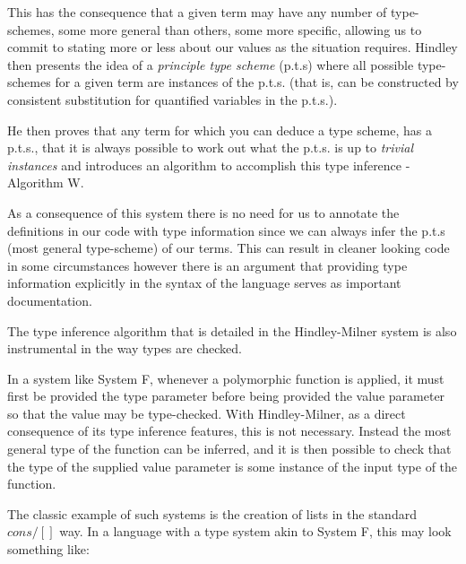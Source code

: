 \documentclass{ProgressReport}[2020/09/15]
\begin{document}
            This has the consequence that a given term may have any number of
            type-schemes, some more general than others, some more specific,
            allowing us to commit to stating more or less about our
            values as the situation requires. Hindley then presents
            the idea of a \textit{principle type scheme} (p.t.s) where
            all possible type-schemes for a given term are instances
            of the p.t.s. (that is, can be constructed by consistent
            substitution for quantified variables in the p.t.s.).
            
            He then proves that any term for which you can deduce a type scheme,
            has a p.t.s., that it is always possible to work out what the p.t.s. is
            up to \textit{trivial instances} and introduces an
            algorithm to accomplish this type inference - Algorithm W.

            As a consequence of this system there is no need for us to
            annotate the definitions in our code with type
            information since we can always infer the p.t.s (most
            general type-scheme) of our terms. This can result
            in cleaner looking code in some circumstances however
            there is an argument that providing type information
            explicitly in the syntax of the language serves as
            important documentation.
            
            The type inference algorithm that is detailed in the Hindley-Milner
            system is also instrumental in the way types are checked.
            
            In a system like System F, whenever a polymorphic
            function is applied, it must first be provided the type
            parameter before being provided
            the value parameter so that the value may be
            type-checked. With Hindley-Milner, as a direct consequence
            of its type inference features, this is not
            necessary. Instead the
            most general type of the function can be inferred, and it
            is then possible to check that the type of the supplied
            value parameter is some instance of the input type of the function.
            
            The classic example of such systems is the creation of lists in the
            standard $cons/[]$ way. In a language with a type system akin to
            System F, this may look
            something like:
            
\end{document}
